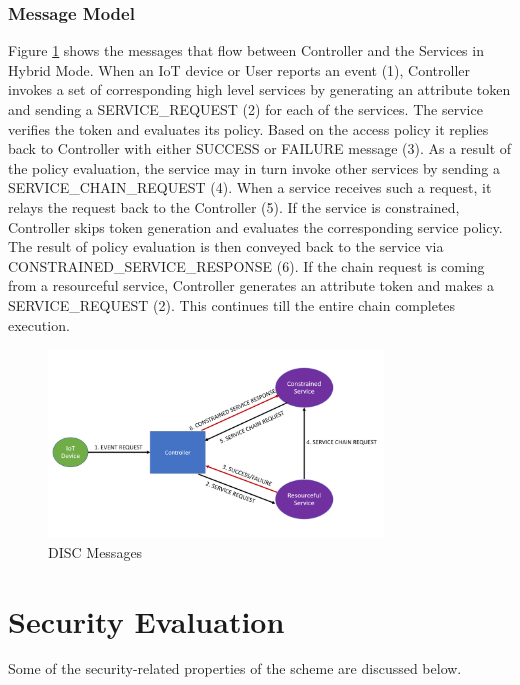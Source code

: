 \documentclass[journal]{IEEEtran}
\begin{document}
\subsubsection{Message Model} \label{message_model}
Figure \ref{fig:message_model} shows the messages that flow between Controller and the Services in Hybrid Mode. When an IoT device or User reports an event (1), Controller invokes a set of corresponding high level services by generating an attribute token and sending a SERVICE\_REQUEST (2) for each of the services. The service verifies the token and evaluates its policy. Based on the access policy it replies back to Controller with either SUCCESS or FAILURE message (3). As a result of the policy evaluation, the service may in turn invoke other services by sending a SERVICE\_CHAIN\_REQUEST (4). When a service receives such a request, it relays the request back to the Controller (5). If the service is constrained, Controller skips token generation and evaluates the corresponding service policy. The result of policy evaluation is then conveyed back to the service via CONSTRAINED\_SERVICE\_RESPONSE (6). If the chain request is coming from a resourceful service, Controller generates an attribute token and makes a SERVICE\_REQUEST (2). This continues till the entire chain completes execution.

\begin{figure}[htbp]
\centerline{\includegraphics[width=3.5in]{messages.png}}
\caption{DISC Messages}
\label{fig:message_model}
\end{figure}


\section{Security Evaluation} \label{seceval}
Some of the security-related properties of the scheme are discussed below.
\end{document}
